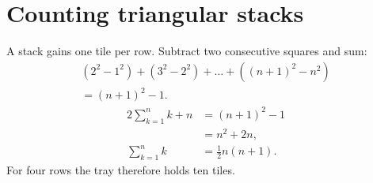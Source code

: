 \documentclass{article}
\begin{document}
\section*{Counting triangular stacks}

A stack gains one tile per row. Subtract two consecutive squares and sum:
\begin{multline}
 (2^2-1^2)+(3^2-2^2)+\dots+((n+1)^2-n^2)\\
 = (n+1)^2-1.
\end{multline}
\begin{align*}
 2\sum_{k=1}^n k+n &= (n+1)^2-1\\
 &= n^2+2n,\\
 \sum_{k=1}^n k &= \tfrac12 n(n+1).
\end{align*}
For four rows the tray therefore holds ten tiles.
\end{document}
